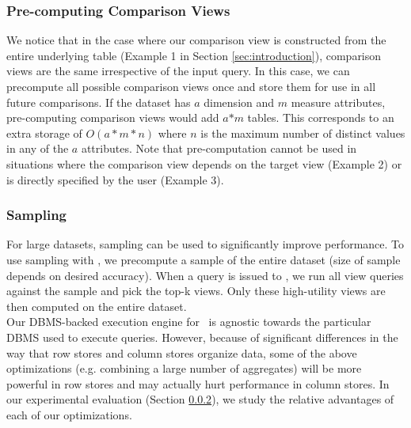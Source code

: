  \subsubsection {Pre-computing Comparison Views}
  We notice that in the case where our comparison view is constructed from the
  entire underlying table (Example 1 in Section \ref{sec:introduction}),
  comparison views are the same irrespective of the input query.
  In this case, we can precompute all possible comparison views once and store
  them for use in all future comparisons. If the dataset has $a$ dimension and
  $m$ measure attributes, pre-computing comparison views would add $a$$\ast$$m$
  tables. This corresponds to an extra storage of $O(a\ast m \ast n)$ where $n$
  is the maximum number of distinct values in any of the $a$ attributes. 
  Note that pre-computation cannot be used in situations where the comparison
  view depends on the target view (Example 2) or is directly specified by the
  user (Example 3).
  
\subsubsection {Sampling}
  For large datasets, sampling can be used to significantly improve
  performance. To use sampling with \SeeDB, we precompute a sample of the
  entire dataset (size of sample depends on desired accuracy). When a query is
  issued to \SeeDB, we run all view queries against the sample and pick the
  top-k views. Only these high-utility views are then computed on the entire
  dataset. \\

Our DBMS-backed execution engine for \SeeDB\ is agnostic towards the
particular DBMS used to execute queries. 
However, because of significant differences in the way that row stores and
column stores organize data, some of the above optimizations (e.g. combining a
large number of aggregates) will be more powerful in row stores and may actually
hurt performance in column stores. In our experimental evaluation (Section
\ref{}), we study the relative advantages of each of our optimizations.
